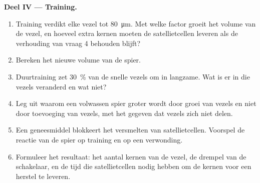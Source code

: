 \begin{problem}
\medskip
\noindent\textbf{Deel IV --- Training.}
\begin{enumerate}[resume]
  \item Training verdikt elke vezel tot \qty{80}{\micro m}. Met welke factor
        groeit het volume van de vezel, en hoeveel extra kernen moeten de
        satellietcellen leveren als de verhouding van vraag 4 behouden
        blijft?
  \item Bereken het nieuwe volume van de spier.
  \item Duurtraining zet \qty{30}{\%} van de snelle vezels om in langzame.
        Wat is er in die vezels veranderd en wat niet?
  \item Leg uit waarom een volwassen spier groter wordt door groei van vezels
        en niet door toevoeging van vezels, met het gegeven dat vezels zich
        niet delen.
  \item Een geneesmiddel blokkeert het versmelten van satellietcellen.
        Voorspel de reactie van de spier op training en op een verwonding.
  \item Formuleer het resultaat: het aantal kernen van de vezel, de drempel
        van de schakelaar, en de tijd die satellietcellen nodig hebben om de
        kernen voor een herstel te leveren.
\end{enumerate}
\end{problem}
